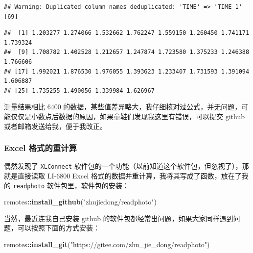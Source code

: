 \documentclass[
]{krantz}
\makeatletter
\newenvironment{Shaded}{\begin{snugshade}}{\end{snugshade}}
\newcommand{\KeywordTok}[1]{\textcolor[rgb]{0.13,0.29,0.53}{\textbf{#1}}}
\newcommand{\NormalTok}[1]{#1}
\newcommand{\OperatorTok}[1]{\textcolor[rgb]{0.81,0.36,0.00}{\textbf{#1}}}
\newcommand{\StringTok}[1]{\textcolor[rgb]{0.31,0.60,0.02}{#1}}
\newenvironment{kframe}{%
\medskip{}
\setlength{\fboxsep}{.8em}
 \def\at@end@of@kframe{}%
 \ifinner\ifhmode%
  \def\at@end@of@kframe{\end{minipage}}%
  \begin{minipage}{\columnwidth}%
 \fi\fi%
 \def\FrameCommand##1{\hskip\@totalleftmargin \hskip-\fboxsep
 \colorbox{shadecolor}{##1}\hskip-\fboxsep
     \hskip-\linewidth \hskip-\@totalleftmargin \hskip\columnwidth}%
 \MakeFramed {\advance\hsize-\width
   \@totalleftmargin\z@ \linewidth\hsize
   \@setminipage}}%
 {\par\unskip\endMakeFramed%
 \at@end@of@kframe}
\renewenvironment{Shaded}{\begin{kframe}}{\end{kframe}}
\makeatother
\begin{document}
\begin{verbatim}
## Warning: Duplicated column names deduplicated: 'TIME' => 'TIME_1' [69]
\end{verbatim}

\begin{Shaded}
\end{Shaded}

\begin{verbatim}
##  [1] 1.203277 1.274066 1.532662 1.762247 1.559150 1.260450 1.741171 1.739324
##  [9] 1.708782 1.402528 1.212657 1.247874 1.723580 1.375233 1.246388 1.766606
## [17] 1.992021 1.876530 1.976055 1.393623 1.233407 1.731593 1.391094 1.606887
## [25] 1.735255 1.490056 1.339984 1.626967
\end{verbatim}

测量结果相比 6400 的数据，某些值差异略大，我仔细核对过公式，并无问题，可能仅仅是小数点后数据的原因，如果童鞋们发现我这里有错误，可以提交 github 或者邮箱发送给我，便于我改正。

\hypertarget{excel-recompute-68}{%
\subsubsection{Excel 格式的重计算}\label{excel-recompute-68}}

偶然发现了 \texttt{XLConnect} 软件包的一个功能（以前知道这个软件包，但忽视了），那就是直接读取 LI-6800 Excel 格式的数据并重计算，我将其写成了函数，放在了我的 \texttt{readphoto} 软件包里，软件包的安装：

\begin{Shaded}
\begin{Highlighting}[]
\NormalTok{remotes}\OperatorTok{::}\KeywordTok{install_github}\NormalTok{(}\StringTok{"zhujiedong/readphoto"}\NormalTok{)}
\end{Highlighting}
\end{Shaded}

当然，最近连我自己安装 github 的软件包都经常出问题，如果大家同样遇到问题，可以按照下面的方式安装：

\begin{Shaded}
\begin{Highlighting}[]
\NormalTok{remotes}\OperatorTok{::}\KeywordTok{install_git}\NormalTok{(}\StringTok{"https://gitee.com/zhu_jie_dong/readphoto"}\NormalTok{)}
\end{Highlighting}
\end{Shaded}
\end{document}
